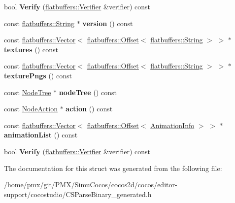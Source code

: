 \begin{DoxyCompactItemize}
\item 
\mbox{\label{structflatbuffers_1_1CSParseBinary_ae2b2580a5f7b6ed65ccffaa965cb51e8}} 
bool {\bfseries Verify} (\hyperlink{classflatbuffers_1_1Verifier}{flatbuffers\+::\+Verifier} \&verifier) const
\item 
\mbox{\label{structflatbuffers_1_1CSParseBinary_a90fd29051ae981580b86ac108557fbf1}} 
const \hyperlink{structflatbuffers_1_1String}{flatbuffers\+::\+String} $\ast$ {\bfseries version} () const
\item 
\mbox{\label{structflatbuffers_1_1CSParseBinary_a09a7224e510f7724b91fffe8cd2bc892}} 
const \hyperlink{classflatbuffers_1_1Vector}{flatbuffers\+::\+Vector}$<$ \hyperlink{structflatbuffers_1_1Offset}{flatbuffers\+::\+Offset}$<$ \hyperlink{structflatbuffers_1_1String}{flatbuffers\+::\+String} $>$ $>$ $\ast$ {\bfseries textures} () const
\item 
\mbox{\label{structflatbuffers_1_1CSParseBinary_a20ef25308ec0e907d42bd62d659935be}} 
const \hyperlink{classflatbuffers_1_1Vector}{flatbuffers\+::\+Vector}$<$ \hyperlink{structflatbuffers_1_1Offset}{flatbuffers\+::\+Offset}$<$ \hyperlink{structflatbuffers_1_1String}{flatbuffers\+::\+String} $>$ $>$ $\ast$ {\bfseries texture\+Pngs} () const
\item 
\mbox{\label{structflatbuffers_1_1CSParseBinary_a97dc182bfe7b38e00a4d892045d5f6d0}} 
const \hyperlink{structflatbuffers_1_1NodeTree}{Node\+Tree} $\ast$ {\bfseries node\+Tree} () const
\item 
\mbox{\label{structflatbuffers_1_1CSParseBinary_a73dca0466f1137e0ba3678c8d587af8d}} 
const \hyperlink{structflatbuffers_1_1NodeAction}{Node\+Action} $\ast$ {\bfseries action} () const
\item 
\mbox{\label{structflatbuffers_1_1CSParseBinary_a88d2ec51c1af471a804497bcbb7d9ee1}} 
const \hyperlink{classflatbuffers_1_1Vector}{flatbuffers\+::\+Vector}$<$ \hyperlink{structflatbuffers_1_1Offset}{flatbuffers\+::\+Offset}$<$ \hyperlink{structflatbuffers_1_1AnimationInfo}{Animation\+Info} $>$ $>$ $\ast$ {\bfseries animation\+List} () const
\item 
\mbox{\label{structflatbuffers_1_1CSParseBinary_ae2b2580a5f7b6ed65ccffaa965cb51e8}} 
bool {\bfseries Verify} (\hyperlink{classflatbuffers_1_1Verifier}{flatbuffers\+::\+Verifier} \&verifier) const
\end{DoxyCompactItemize}


The documentation for this struct was generated from the following file\+:\begin{DoxyCompactItemize}
\item 
/home/pmx/git/\+P\+M\+X/\+Simu\+Cocos/cocos2d/cocos/editor-\/support/cocostudio/C\+S\+Parse\+Binary\+\_\+generated.\+h\end{DoxyCompactItemize}
